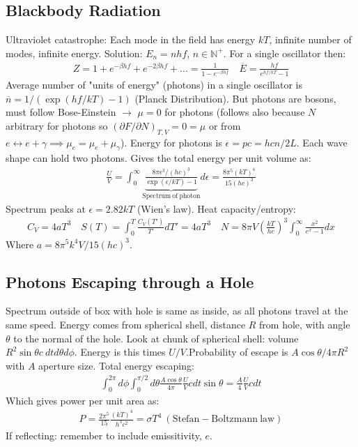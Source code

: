\documentclass[12pt]{article}
\begin{document}
\subsection{Blackbody Radiation}
Ultraviolet catastrophe: Each mode in the field has energy $kT$, infinite number of modes, infinite energy. Solution: $E_n=nhf$, $n\in \mathbb{N}^+$. For a single oscillator then:
\begin{align*}
Z=1+e^{-\beta hf}+e^{-2\beta hf}+...=\frac{1}{1-e^{-\beta hf}}\quad \overline{E}=\frac{hf}{e^{hf/kT}-1}
\end{align*}
Average number of "units of energy" (photons) in a single oscillator is $\overline{n}=1/(\exp(hf/kT)-1)$ (Planck Distribution). But photons are bosons, must follow Bose-Einstein $\rightarrow$ $\mu=0$ for photons (follows also because $N$ arbitrary for photons so $(\partial F/\partial N)_{T,V}=0=\mu$ or from $e\leftrightarrow e+\gamma \implies \mu_e=\mu_e+\mu_{\gamma}$). Energy for photons is $\epsilon=pc=hcn/2L$. Each wave shape can hold two photons. Gives the total energy per unit volume as:
\begin{align*}
\frac{U}{V}=\int_0^{\infty} \underbrace{\frac{8\pi \epsilon^3/(hc)^3}{\exp(\epsilon/kT)-1}}_{\mathrm{Spectrum\ of\ photon}} d\epsilon = \frac{8\pi^5(kT)^4}{15 (hc)^3}
\end{align*}
Spectrum peaks at $\epsilon=2.82 kT$ (Wien's law). Heat capacity/entropy:
\begin{align*}
C_V=4aT^3 \quad S(T)=\int_0^T \frac{C_V(T')}{T'}dT'=4aT^3 \quad N=8\pi V\left(\frac{kT}{hc}\right)^3 \int_0^{\infty} \frac{x^2}{e^x-1}dx
\end{align*}
Where $a=8\pi^5k^4V/15(hc)^3$.
\subsection{Photons Escaping through a Hole}
Spectrum outside of box with hole is same as inside, as all photons travel at the same speed. Energy comes from spherical shell, distance $R$ from hole, with angle $\theta$ to the normal of the hole. Look at chunk of spherical shell: volume $R^2 \sin \theta c\ dt d\theta d\phi$. Energy is this times $U/V$.Probability of escape is $A\cos \theta/4\pi R^2$ with $A$ aperture size. Total energy escaping:
\begin{align*}
\int_0^{2\pi}d\phi \int_0^{\pi/2} d\theta \frac{A\cos \theta}{4\pi}\frac{U}{V}cdt\sin \theta = \frac{A}{4}\frac{U}{V}cdt
\end{align*}
Which gives power per unit area as:
\begin{align*}
P=\frac{2\pi^5}{15}\frac{\left(kT\right)^4}{h^3c^2}=\sigma T^4 \ \mathrm{(Stefan-Boltzmann\ law)}
\end{align*}
If reflecting: remember to include emissitivity, $e$.
\end{document}
